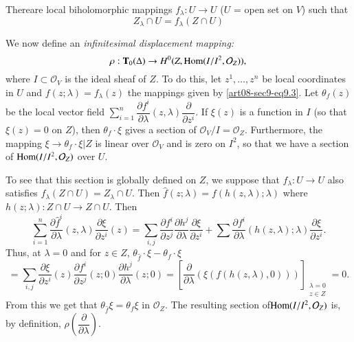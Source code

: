 There\pageoriginale are local biholomorphic mappings $f_{\lambda}:U\to U$ ($U$ = open set on $V$) such that 
\setcounter{equation}{2}
\begin{equation}
Z_{\lambda}\cap U=f_{\lambda}(Z\cap U)\label{art08-sec9-eq9.3}
\end{equation}

We now define an {\em infinitesimal displacement mapping:}
\begin{equation}
\rho : \mathbf{T}_{0}(\Delta)\to H^{0}(Z,\operatorname{\mathrm{Hom}}(I/I^{2},\mathcal{O}_{Z})),\label{art08-sec9-eq9.4}
\end{equation}
where $I\subset \mathcal{O}_{V}$ is the ideal sheaf of $Z$. To do this, let $z^{1},\ldots,z^{n}$ be local coordinates in $U$ and $f(z;\lambda)=f_{\lambda}(z)$ the mappings given by \eqref{art08-sec9-eq9.3}. Let $\theta_{f}(z)$ be the local vector field $\sum\limits^{n}_{i=1}\dfrac{\partial f^{i}}{\partial \lambda}(z,\lambda)\dfrac{\partial}{\partial z^{i}}$. If $\xi(z)$ is a function in $I$ (so that $\xi(z)=0$ on $Z$), then $\theta_{f}\cdot \xi$ gives a section of $\mathcal{O}_{V}/I=\mathcal{O}_{Z}$. Furthermore, the mapping $\xi\to \theta_{f}\cdot \xi|Z$ is linear over $\mathcal{O}_{V}$ and is zero on $I^{2}$, so that we have a section of $\operatorname{\mathrm{Hom}}(I/I^{2},\mathcal{O}_{Z})$ over $U$.

To see that this section is globally defined on $Z$, we suppose that $\widehat{f}_{\lambda}:U\to U$ also satisfies $\widehat{f}_{\lambda}(Z\cap U)=Z_{\lambda}\cap U$. Then $\widehat{f}(z;\lambda)=f(h(z,\lambda);\lambda)$ where $h(z;\lambda):Z\cap U\to Z\cap U$. Then
$$
\sum\limits^{n}_{i=1}\dfrac{\partial \widehat{f}^{i}}{\partial\lambda}(z,\lambda)\dfrac{\partial\xi}{\partial z^{i}}(z)=\sum\limits_{i,j}\dfrac{\partial f^{i}}{\partial z^{j}}\dfrac{\partial h^{j}}{\partial\lambda}\dfrac{\partial \xi}{\partial z^{i}}+\sum \dfrac{\partial f^{i}}{\partial \lambda}(h(z,\lambda);\lambda)\dfrac{\partial \xi}{\partial z^{i}}.
$$
Thus, at $\lambda=0$ and for $z\in Z$, $\theta_{\widehat{f}}\cdot \xi-\theta_{f}\cdot \xi$
$$
=\sum\limits_{i,j}\dfrac{\partial \xi}{\partial z^{i}}(z)\dfrac{\partial f^{i}}{\partial z^{j}}(z;0)\dfrac{\partial h^{j}}{\partial \lambda}(z;0)=\left[\dfrac{\partial}{\partial\lambda}(\xi(f(h(z,\lambda),0)))\right]_{\substack{\lambda=0\\ z\in Z}}=0.
$$
From this we get that $\theta_{\widehat{f}}\xi=\theta_{f}\xi$ in $\mathcal{O}_{Z}$. The resulting section of\break $\operatorname{\mathrm{Hom}}(I/I^{2},\mathcal{O}_{Z})$ is, by definition, $\rho\left(\dfrac{\partial}{\partial\lambda}\right)$.

